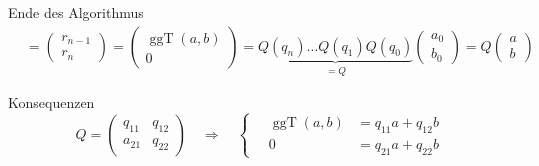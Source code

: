 \begin{frame}[t]
\begin{block}{Ende des Algorithmus}
\begin{align*}
&=
\begin{pmatrix}
r_{n-1}\\
r_{n}
\end{pmatrix}
=
\begin{pmatrix}
\operatorname{ggT}(a,b) \\
0
\end{pmatrix}
=
\underbrace{Q(q_n)
\dots
Q(q_1)
Q(q_0)}_{\displaystyle =Q}
\begin{pmatrix} a_0\\ b_0\end{pmatrix}
=
Q\begin{pmatrix}a\\b\end{pmatrix}
\end{align*}
\end{block}
\begin{block}{Konsequenzen}
\[
Q=\begin{pmatrix}
q_{11}&q_{12}\\
a_{21}&q_{22}
\end{pmatrix}
\quad\Rightarrow\quad
\left\{
\quad
\begin{aligned}
\operatorname{ggT}(a,b) &= q_{11}a + q_{12}b \\
                      0 &= q_{21}a + q_{22}b
\end{aligned}
\right.
\]
\end{block}

\end{frame}
